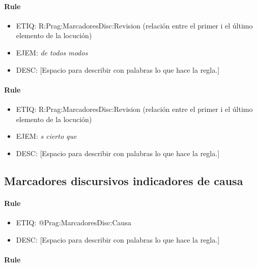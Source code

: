 \documentclass[11pt]{report}
\begin{document}
\paragraph*{Rule}
\begin{itemize}
\item ETIQ: R:Prag:MarcadoresDisc:Revision (relación entre el primer i el último elemento de la locución)
\item EJEM: \emph{de todos modos}
\item DESC: [Espacio para describir con palabras lo que hace la regla.]
\end{itemize}

\paragraph*{Rule}
\begin{itemize}
\item ETIQ: R:Prag:MarcadoresDisc:Revision (relación entre el primer i el último elemento de la locución)
\item EJEM: \emph{s cierto que}
\item DESC: [Espacio para describir con palabras lo que hace la regla.]
\end{itemize}

\subsection{Marcadores discursivos indicadores de causa}
\paragraph*{Rule}
\begin{itemize}
\item ETIQ: @Prag:MarcadoresDisc:Causa
\item DESC: [Espacio para describir con palabras lo que hace la regla.]
\end{itemize}

\paragraph*{Rule}
\end{document}
